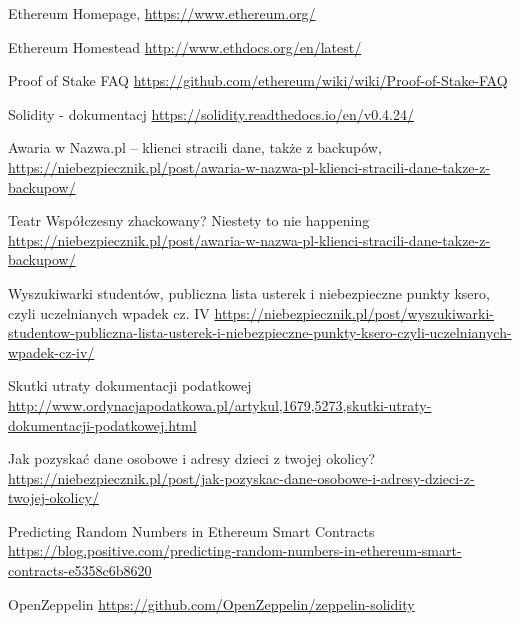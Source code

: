 \documentclass[]{llncs}
\begin{document}
% 
%
\begin{thebibliography}{splncs04}

   Ethereum Homepage,
  \url{https://www.ethereum.org/}

   Ethereum Homestead
  \url{http://www.ethdocs.org/en/latest/}

   Proof of Stake FAQ
  \url{https://github.com/ethereum/wiki/wiki/Proof-of-Stake-FAQ}

   Solidity - dokumentacj
  \url{https://solidity.readthedocs.io/en/v0.4.24/}

   Awaria w Nazwa.pl – klienci stracili dane,
  także z backupów,
  \url{https://niebezpiecznik.pl/post/awaria-w-nazwa-pl-klienci-stracili-dane-takze-z-backupow/}

   Teatr Współczesny zhackowany?
  Niestety to nie happening
  \url{https://niebezpiecznik.pl/post/awaria-w-nazwa-pl-klienci-stracili-dane-takze-z-backupow/}

   Wyszukiwarki studentów, publiczna lista
  usterek i niebezpieczne punkty ksero, czyli uczelnianych wpadek cz. IV
  \url{https://niebezpiecznik.pl/post/wyszukiwarki-studentow-publiczna-lista-usterek-i-niebezpieczne-punkty-ksero-czyli-uczelnianych-wpadek-cz-iv/}

   Skutki utraty dokumentacji podatkowej
  \url{http://www.ordynacjapodatkowa.pl/artykul,1679,5273,skutki-utraty-dokumentacji-podatkowej.html}

   Jak pozyskać dane osobowe i adresy dzieci z twojej
  okolicy?
  \url{https://niebezpiecznik.pl/post/jak-pozyskac-dane-osobowe-i-adresy-dzieci-z-twojej-okolicy/}

   Predicting Random Numbers in Ethereum Smart Contracts
  \url{https://blog.positive.com/predicting-random-numbers-in-ethereum-smart-contracts-e5358c6b8620}

   OpenZeppelin
  \url{https://github.com/OpenZeppelin/zeppelin-solidity}

\end{thebibliography}




\end{document}
